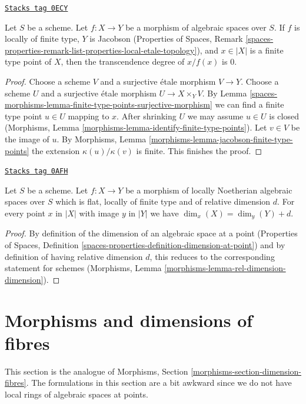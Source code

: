 \begin{lemma}
\label{spaces-morphisms-lemma-jacobson-finite-type-points}
\href{https://stacks.math.columbia.edu/tag/0ECY}{\texttt{Stacks tag 0ECY}}

Let $S$ be a scheme. Let $f : X \to Y$ be a morphism of algebraic spaces
over $S$. If $f$ is locally of finite type, $Y$ is Jacobson
(Properties of Spaces, Remark
\ref{spaces-properties-remark-list-properties-local-etale-topology}),
and $x \in |X|$ is a finite type point of $X$,
then the transcendence degree of $x/f(x)$ is $0$.
\end{lemma}

\begin{proof}
Choose a scheme $V$ and a surjective \'etale morphism $V \to Y$.
Choose a scheme $U$ and a surjective \'etale morphism $U \to X \times_Y V$.
By Lemma \ref{spaces-morphisms-lemma-finite-type-points-surjective-morphism}
we can find a finite type point $u \in U$ mapping to $x$.
After shrinking $U$ we may assume $u \in U$ is closed
(Morphisms, Lemma \ref{morphisms-lemma-identify-finite-type-points}).
Let $v \in V$ be the image of $u$. By
Morphisms, Lemma \ref{morphisms-lemma-jacobson-finite-type-points}
the extension $\kappa(u)/\kappa(v)$ is finite.
This finishes the proof.
\end{proof}

\begin{lemma}
\label{spaces-morphisms-lemma-rel-dimension-dimension}
\href{https://stacks.math.columbia.edu/tag/0AFH}{\texttt{Stacks tag 0AFH}}

Let $S$ be a scheme. Let $f : X \to Y$ be a morphism of locally Noetherian
algebraic spaces over $S$ which is flat, locally of finite type and of
relative dimension $d$. For every point $x$ in $|X|$ with image
$y$ in $|Y|$ we have $\dim_x(X) = \dim_y(Y) + d$.
\end{lemma}

\begin{proof}
By definition of the dimension of an algebraic space
at a point (Properties of Spaces, Definition
\ref{spaces-properties-definition-dimension-at-point})
and by definition of having relative dimension $d$,
this reduces to the corresponding statement for schemes
(Morphisms, Lemma \ref{morphisms-lemma-rel-dimension-dimension}).
\end{proof}

\section{Morphisms and dimensions of fibres}
\label{spaces-morphisms-section-dimension-fibres}
This section is the analogue of
Morphisms, Section \ref{morphisms-section-dimension-fibres}.
The formulations in this section are a bit awkward since
we do not have local rings of algebraic spaces at points.

